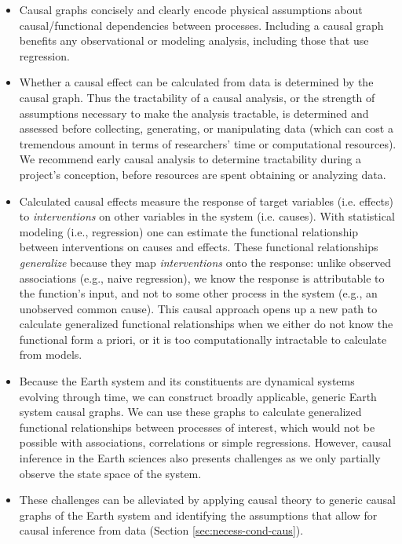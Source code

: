 \documentclass[12pt]{article}
\begin{document}
\begin{itemize}
\item Causal graphs concisely and clearly encode physical assumptions about
  causal/functional dependencies between processes. Including a causal
  graph benefits any observational or modeling analysis, including
  those that use regression.
\item Whether a causal effect can be calculated from data is
  determined by the causal graph. Thus the tractability of a causal
  analysis, or the strength of assumptions necessary to make the
  analysis tractable, is determined and assessed before collecting,
  generating, or manipulating data (which can cost a tremendous amount
  in terms of researchers' time or computational resources). We
  recommend early causal analysis to determine tractability during a
  project's conception, before resources are spent obtaining or
  analyzing data.
\item Calculated causal effects measure the response of target
  variables (i.e. effects) to \textit{interventions} on other
  variables in the system (i.e. causes). With statistical modeling
  (i.e., regression) one can estimate the functional relationship
  between interventions on causes and effects.  These functional
  relationships \textit{generalize} because they map
  \textit{interventions} onto the response: unlike observed
  associations (e.g., naive regression), we know the response is
  attributable to the function's input, and not to some other process in
  the system (e.g., an unobserved common cause). This causal approach opens
  up a new path to calculate generalized functional relationships when
  we either do not know the functional form a priori, or it is too
  computationally intractable to calculate from models.
\item Because the Earth system and its constituents are dynamical
  systems evolving through time, we can construct broadly applicable,
  generic Earth system causal graphs. We can use these graphs to
  calculate generalized functional relationships between processes of
  interest, which would not be possible with associations, correlations
  or simple regressions. However, causal inference in the Earth
  sciences also presents challenges as we only partially observe the
  state space of the system.
\item These challenges can be alleviated by applying causal theory to
  generic causal graphs of the Earth system and identifying the
  assumptions that allow for causal inference from data (Section
  \ref{sec:necess-cond-caus}).
\end{itemize}
\end{document}
